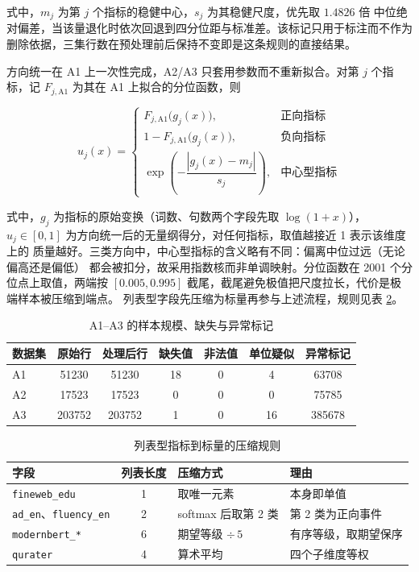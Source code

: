 \documentclass[bwprint]{gmcmthesis}
\numberwithin{equation}{section}
\numberwithin{figure}{section}
\numberwithin{table}{section}
\begin{document}
式中，$m_j$ 为第 $j$ 个指标的稳健中心，$s_j$ 为其稳健尺度，优先取 $1.4826$ 倍
中位绝对偏差，当该量退化时依次回退到四分位距与标准差。该标记只用于标注而不作为
删除依据，三集行数在预处理前后保持不变即是这条规则的直接结果。

方向统一在 A1 上一次性完成，A2/A3 只套用参数而不重新拟合。对第 $j$ 个指标，记
$F_{j,\mathrm{A1}}$ 为其在 A1 上拟合的分位函数，则

\begin{equation}
u_j(x)=\begin{cases}
F_{j,\mathrm{A1}}\bigl(g_j(x)\bigr), & \text{正向指标}\\[2pt]
1-F_{j,\mathrm{A1}}\bigl(g_j(x)\bigr), & \text{负向指标}\\[2pt]
\exp\!\left(-\dfrac{|g_j(x)-m_j|}{s_j}\right), & \text{中心型指标}
\end{cases}
\end{equation}

式中，$g_j$ 为指标的原始变换（词数、句数两个字段先取 $\log(1+x)$），
$u_j\in[0,1]$ 为方向统一后的无量纲得分，对任何指标，取值越接近 1 表示该维度上的
质量越好。三类方向中，中心型指标的含义略有不同：偏离中位过远（无论偏高还是偏低）
都会被扣分，故采用指数核而非单调映射。分位函数在 2001 个分位点上取值，两端按
$[0.005,0.995]$ 截尾，截尾避免极值把尺度拉长，代价是极端样本被压缩到端点。
列表型字段先压缩为标量再参与上述流程，规则见表 \ref{tab:q1-listrule}。

\begin{table}[htp!]
\centering
\renewcommand\arraystretch{1.2}
\caption{A1--A3 的样本规模、缺失与异常标记}\label{tab:q1-perproc}
\begin{tabular*}{\textwidth}{@{\extracolsep{\fill}}lcccccc@{}}
\toprule
数据集 & 原始行 & 处理后行 & 缺失值 & 非法值 & 单位疑似 & 异常标记 \\
\midrule
A1 & 51230 & 51230 & 18 & 0 & 4 & 63708 \\
A2 & 17523 & 17523 & 0 & 0 & 0 & 75785 \\
A3 & 203752 & 203752 & 1 & 0 & 16 & 385678 \\
\bottomrule
\end{tabular*}
\end{table}

\begin{table}[htp!]
\centering
\renewcommand\arraystretch{1.2}
\caption{列表型指标到标量的压缩规则}\label{tab:q1-listrule}
\begin{tabularx}{\textwidth}{lclX}
\toprule
字段 & 列表长度 & 压缩方式 & 理由 \\
\midrule
\texttt{fineweb\_edu} & 1 & 取唯一元素 & 本身即单值 \\
\texttt{ad\_en}、\texttt{fluency\_en} & 2 & softmax 后取第 2 类 & 第 2 类为正向事件 \\
\texttt{modernbert\_*} & 6 & 期望等级 $\div\,5$ & 有序等级，取期望保序 \\
\texttt{qurater} & 4 & 算术平均 & 四个子维度等权 \\
\bottomrule
\end{tabularx}
\end{table}
\end{document}
